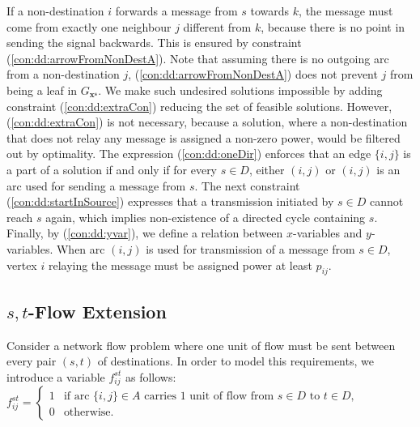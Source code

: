 If a non-destination $i$ forwards a message from $s$ towards $k$, the message must come from exactly one neighbour $j$ different from $k$, because there is no point in sending the signal backwards. This is ensured by constraint (\ref{con:dd:arrowFromNonDestA}). Note that assuming there is no outgoing arc from a non-destination $j$, (\ref{con:dd:arrowFromNonDestA}) does not prevent $j$ from being a leaf in $G_{\mathbf{x^s}}$. We make such undesired solutions impossible by adding constraint (\ref{con:dd:extraCon}) reducing the set of feasible solutions. However, (\ref{con:dd:extraCon}) is not necessary, because a solution, where a non-destination that does not relay any message is assigned a non-zero power, would be filtered out by optimality. The expression (\ref{con:dd:oneDir}) enforces that an edge $\{i,j\}$ is a part of a solution if and only if for every $s\in D$, either $(i,j)$ or $(i,j)$ is an arc used for sending a message from $s$. The next constraint (\ref{con:dd:startInSource}) expresses that a transmission initiated by $s\in D$ cannot reach $s$ again, which implies non-existence of a directed cycle containing $s$. Finally, by (\ref{con:dd:yvar}), we define a relation between $x$-variables and $y$-variables. When arc $(i,j)$ is used for transmission of a message from $s\in D$, vertex $i$ relaying the message must be assigned power at least $p_{ij}$.
\subsection{$s,t$-Flow Extension}
Consider a network flow problem where one unit of flow must be sent between every pair  $(s,t)$ of destinations. In order to model this requirements, we introduce a variable $f^{st}_{ij}$ as follows:
\newline\newline
  $f_{ij}^{st}=
	\begin{cases}
    1 & \text{if arc $\{i,j\} \in A$ carries 1 unit of flow from $s\in D$ to $t\in D$},\\
    0 & \text{otherwise}.
  \end{cases}$
\newline\newline


